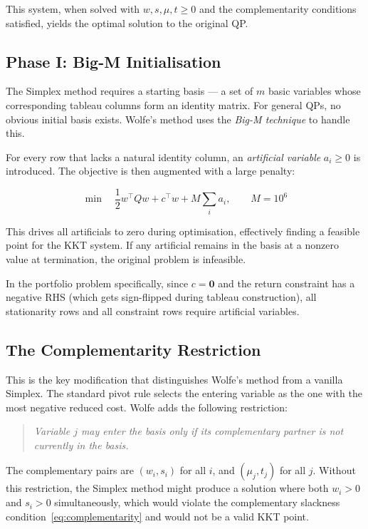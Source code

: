 \documentclass[conference]{IEEEtran}
\begin{document}
This system, when solved with $w, s, \mu, t \geq 0$ and the complementarity
conditions satisfied, yields the optimal solution to the original QP.

\subsection{Phase I: Big-M Initialisation}

The Simplex method requires a starting basis --- a set of $m$ basic variables
whose corresponding tableau columns form an identity matrix. For general QPs,
no obvious initial basis exists. Wolfe's method uses the \textit{Big-M
technique} to handle this.

For every row that lacks a natural identity column, an \textit{artificial
variable} $a_i \geq 0$ is introduced. The objective is then augmented with a
large penalty:

\begin{equation}
    \min \quad \frac{1}{2} w^\top Q w + c^\top w + M \sum_i a_i,
    \qquad M = 10^6
    \label{eq:bigm}
\end{equation}

This drives all artificials to zero during optimisation, effectively finding
a feasible point for the KKT system. If any artificial remains in the basis at
a nonzero value at termination, the original problem is infeasible.

In the portfolio problem specifically, since $c = \mathbf{0}$ and the return
constraint has a negative RHS (which gets sign-flipped during tableau
construction), all stationarity rows and all constraint rows require artificial
variables.

\subsection{The Complementarity Restriction}

This is the key modification that distinguishes Wolfe's method from a vanilla
Simplex. The standard pivot rule selects the entering variable as the one with
the most negative reduced cost. Wolfe adds the following restriction:

\begin{quote}
    \textit{Variable $j$ may enter the basis only if its complementary
    partner is not currently in the basis.}
\end{quote}

The complementary pairs are $(w_i, s_i)$ for all $i$, and $(\mu_j, t_j)$ for
all $j$. Without this restriction, the Simplex method might produce a solution
where both $w_i > 0$ and $s_i > 0$ simultaneously, which would violate the
complementary slackness condition~\eqref{eq:complementarity} and would not be
a valid KKT point.
\end{document}
